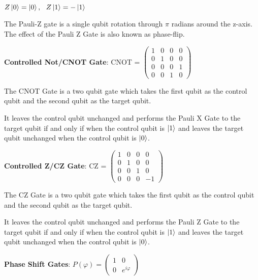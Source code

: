 \documentclass{article}
\begin{document}
\qquad $Z\ket{0} = \ket{0} , \ \ Z\ket{1} = -\ket{1}$
\vspace{5mm}

\noindent
The Pauli-Z gate is a single qubit rotation through $\pi$ radians around the z-axis. The effect of the Pauli Z Gate is also known as phase-flip.
\vspace{5mm}

\textbf{Controlled Not/CNOT Gate}: \qquad CNOT = $\begin{pmatrix} 1 & 0 & 0 & 0 \\ 0 & 1 & 0 & 0 \\ 0 & 0 & 0 & 1 \\ 0 & 0 & 1 & 0 \end{pmatrix}$
\vspace{5mm}

\noindent
The CNOT Gate is a two qubit gate which takes the first qubit as the control qubit and the second qubit as the target qubit.
\vspace{5mm}

\noindent
It leaves the control qubit unchanged and performs the Pauli X Gate to the target qubit if and only if when the control qubit is $\ket{1}$ and leaves the target qubit unchanged when the control qubit is $\ket{0}$.
\vspace{5mm}

\textbf{Controlled Z/CZ Gate}: \qquad CZ = $\begin{pmatrix} 1 & 0 & 0 & 0 \\ 0 & 1 & 0 & 0 \\ 0 & 0 & 1 & 0 \\ 0 & 0 & 0 & -1 \end{pmatrix}$
\vspace{5mm}

\noindent
The CZ Gate is a two qubit gate which takes the first qubit as the control qubit and the second qubit as the target qubit.
\vspace{5mm}

\noindent
It leaves the control qubit unchanged and performs the Pauli Z Gate to the target qubit if and only if when the control qubit is $\ket{1}$ and leaves the target qubit unchanged when the control qubit is $\ket{0}$.
\vspace{5mm}

\textbf{Phase Shift Gates}: \qquad $ P(\varphi) = \begin{pmatrix} 1 & 0 \\ 0 & e^{i\varphi} \end{pmatrix}$ 
\vspace{5mm}
\end{document}
